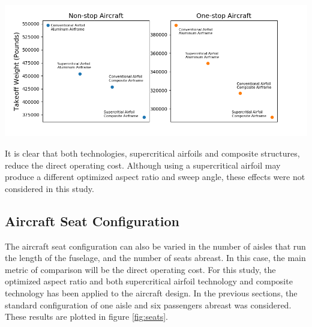 \documentclass{article}
\begin{document}
        \begin{center}
            \includegraphics[scale=0.7]{tech_weight.PNG}
            \label{fig:weight}
        \end{center}

        \begin{flushleft}
            It is clear that both technologies, supercritical airfoils and
            composite structures, reduce the direct operating cost. Although
            using a supercritical airfoil may produce a different optimized
            aspect ratio and sweep angle, these effects were not considered in this
            study.
        \end{flushleft}

    \subsection{Aircraft Seat Configuration}
    \label{sec:seat configuration}
        \begin{flushleft}
            The aircraft seat configuration can also be varied in the number of
            aisles that run the length of the fuselage, and the number of seats
            abreast. In this case, the main metric of comparison will be the
            direct operating cost. For this study, the optimized aspect ratio
            and both supercritical airfoil technology and composite technology
            has been applied to the aircraft design. In the previous sections, the
            standard configuration of one aisle and six passengers abreast
            was considered. These results are plotted in figure \ref{fig:seats}.
        \end{flushleft}
\end{document}
